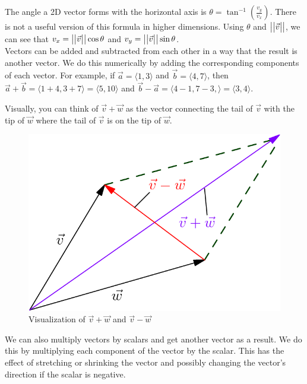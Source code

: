 \noindent
The angle a 2D vector forms with the horizontal axis is $\theta = \tan^{-1}{\left(\frac{v_y}{v_x}\right)}$.
There is not a useful version of this formula in higher dimensions.
Using $\theta$ and $\big\lvert \big\lvert \vec{v} \big\rvert \big\rvert$, we can see that $v_x = \big\lvert \big\lvert \vec{v} \big\rvert \big\rvert\cos{\theta}$ and $v_y = \big\lvert \big\lvert \vec{v} \big\rvert \big\rvert\sin{\theta}$.\\

\noindent
Vectors can be added and subtracted from each other in a way that the result is another vector.
We do this numerically by adding the corresponding components of each vector.
For example, if $\vec{a} = \langle 1,3 \rangle$ and $\vec{b} = \langle 4,7 \rangle$, then $\vec{a}+\vec{b} = \langle 1+4, 3+7 \rangle = \langle 5,10 \rangle$
and $\vec{b}-\vec{a} = \langle 4-1, 7-3, \rangle = \langle 3,4 \rangle$.

\noindent
Visually, you can think of $\vec{v}+\vec{w}$ as the vector connecting the tail of $\vec{v}$ with the tip of $\vec{w}$ where the tail of $\vec{v}$ is on the tip of $\vec{w}$.

\begin{figure}[H]
	\centering
	\includegraphics[scale=0.33]{../common/vectorsMatrices/Parallelogram.png}
	\caption{Visualization of $\vec{v}+\vec{w}$ and $\vec{v} - \vec{w}$}
\end{figure}

\noindent
We can also multiply vectors by scalars and get another vector as a result. We do this by multiplying each component of the vector by the scalar. This has the effect of stretching or shrinking the vector and possibly changing the vector's direction if the scalar is negative.

